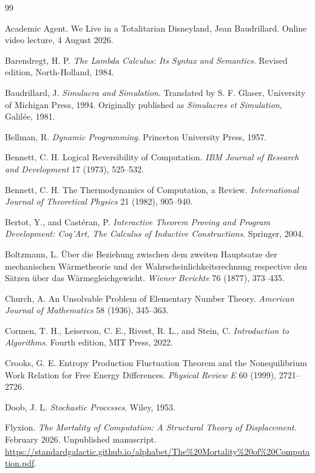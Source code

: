 \documentclass[11pt]{article}
\theoremstyle{definition}
\theoremstyle{remark}
\begin{document}
\begin{thebibliography}{99}

Academic Agent. We Live in a Totalitarian Disneyland, Jean Baudrillard. Online video lecture, 4 August 2026.

Barendregt, H. P. \emph{The Lambda Calculus: Its Syntax and Semantics}. Revised edition, North-Holland, 1984.

Baudrillard, J. \emph{Simulacra and Simulation}. Translated by S. F. Glaser, University of Michigan Press, 1994. Originally published as \emph{Simulacres et Simulation}, Galil\'ee, 1981.

Bellman, R. \emph{Dynamic Programming}. Princeton University Press, 1957.

Bennett, C. H. Logical Reversibility of Computation. \emph{IBM Journal of Research and Development} 17 (1973), 525--532.

Bennett, C. H. The Thermodynamics of Computation, a Review. \emph{International Journal of Theoretical Physics} 21 (1982), 905--940.

Bertot, Y., and Cast\'eran, P. \emph{Interactive Theorem Proving and Program Development: Coq'Art, The Calculus of Inductive Constructions}. Springer, 2004.

Boltzmann, L. \"Uber die Beziehung zwischen dem zweiten Hauptsatze der mechanischen W\"armetheorie und der Wahrscheinlichkeitsrechnung respective den S\"atzen \"uber das W\"armegleichgewicht. \emph{Wiener Berichte} 76 (1877), 373--435.

Church, A. An Unsolvable Problem of Elementary Number Theory. \emph{American Journal of Mathematics} 58 (1936), 345--363.

Cormen, T. H., Leiserson, C. E., Rivest, R. L., and Stein, C. \emph{Introduction to Algorithms}. Fourth edition, MIT Press, 2022.

Crooks, G. E. Entropy Production Fluctuation Theorem and the Nonequilibrium Work Relation for Free Energy Differences. \emph{Physical Review E} 60 (1999), 2721--2726.

Doob, J. L. \emph{Stochastic Processes}. Wiley, 1953.

Flyxion. \emph{The Mortality of Computation: A Structural Theory of Displacement}. February 2026. Unpublished manuscript. \url{https://standardgalactic.github.io/alphabet/The\%20Mortality\%20of\%20Computation.pdf}.


\end{thebibliography}
\end{document}
